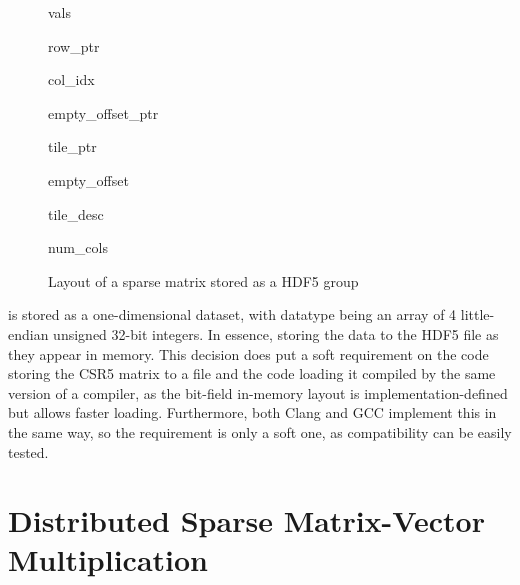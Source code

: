 \documentclass[thesis=M,english]{FITthesis}[2019/12/23]
\begin{document}
\begin{figure}[!h]
    \begin{tcolorbox}[title=/A, colback=gray!30!white]
        \begin{infobox}[colback=hdtsc]
            vals
        \end{infobox}
        \begin{infobox}[colback=hdtsc]
            row\_ptr
        \end{infobox}
        \begin{infobox}[colback=hdtsc]
            col\_idx
        \end{infobox}
        \begin{infobox}[colback=hdtsc, width=0.3\textwidth]
            empty\_offset\_ptr
        \end{infobox}
        \begin{infobox}[colback=hdtsc]
            tile\_ptr
        \end{infobox}
        \begin{infobox}[colback=hdtsc]
            empty\_offset
        \end{infobox}
        \begin{infobox}[colback=hdtsc]
            tile\_desc
        \end{infobox}
        \begin{infobox}[colback=hdatc, width=0.2\textwidth]
            num\_cols
        \end{infobox}
    \end{tcolorbox}
    \caption{Layout of a sparse matrix stored as a HDF5 group}
\end{figure}

 is stored as a one-dimensional dataset, with datatype being
an array of 4 little-endian unsigned 32-bit integers. In essence, storing the data to the HDF5 file as
they appear in memory. This decision does put a soft requirement on the code storing the CSR5 matrix to a file
and the code loading it compiled by the same version of a compiler, as
the bit-field in-memory layout is implementation-defined but allows faster loading. Furthermore, both
Clang and GCC implement this in the same way, so the requirement is only a soft one, as compatibility can
be easily tested.



\chapter{Distributed Sparse Matrix-Vector Multiplication}
\end{document}
